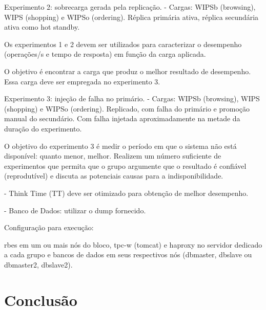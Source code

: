\documentclass[11pt,twoside]{article}
\begin{document}
Experimento 2: sobrecarga gerada pela replicação.
- Cargas: WIPSb (browsing), WIPS (shopping) e WIPSo (ordering).
Réplica primária ativa, réplica secundária  ativa como hot standby.

Os  experimentos  1 e  2  devem  ser  utilizados para  caracterizar  o
desempenho  (operações/s  e tempo  de  resposta)  em função  da  carga
aplicada.

O  objetivo é  encontrar  a carga  que produz  o  melhor resultado  de
desempenho. Essa carga deve ser empregada no experimento 3.


Experimento 3: injeção de falha no primário.
- Cargas: WIPSb (browsing), WIPS (shopping) e WIPSo (ordering).
Replicado, com falha  do primário e promoção manual  do secundário.  Com
falha  injetada  aproximadamente  na  metade da  duração  do
experimento.

O objetivo  do experimento 3  é medir o período  em que o  sistema não
está disponível: quanto menor, melhor.  Realizem um número suficiente de
experimentos  que permita  que o  grupo  argumente que  o resultado  é
confiável  (reprodutível)  e  discuta   as  potenciais  causas  para  a
indisponibilidade.

- Think Time (TT)  deve ser otimizado  para  obtenção  de  melhor  desempenho.

- Banco  de  Dados: utilizar o dump fornecido.

Configuração para execução:

rbes em um ou mais nós do  bloco, tpc-w (tomcat) e haproxy no servidor
dedicado  a cada  grupo  e bancos  de dados  em  seus respectivos  nós
(dbmaster, dbslave ou dbmaster2, dbslave2).


\section{Conclus\~ao}
\end{document}
